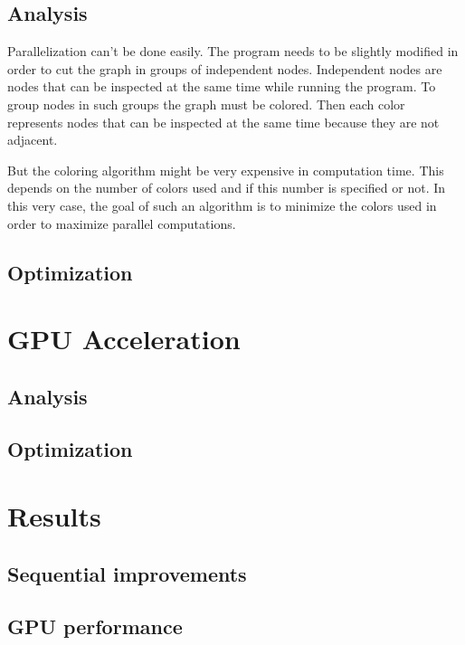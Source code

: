 \documentclass[fleqn,10pt]{SelfArx} %
\begin{document}
\subsection{Analysis}

Parallelization can't be done easily. The program needs to be slightly modified in order to cut the graph in groups of independent nodes. Independent nodes are nodes that can be inspected at the same time while running the program. To group nodes in such groups the graph must be colored. Then each color represents nodes that can be inspected at the same time because they are not adjacent.

But the coloring algorithm might be very expensive in computation time. This depends on the number of colors used and if this number is specified or not. In this very case, the goal of such an algorithm is to minimize the colors used in order to maximize parallel computations.

\subsection{Optimization}

\section{GPU Acceleration}

\subsection{Analysis}

\subsection{Optimization}

\section{Results}

\subsection{Sequential improvements}

\subsection{GPU performance}
\end{document}
